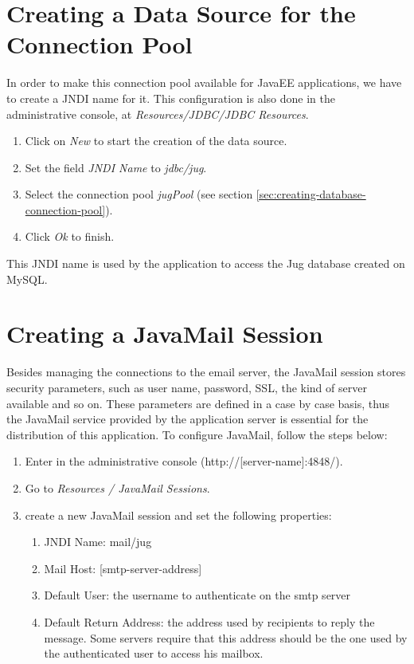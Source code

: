 \documentclass[envcountsame,envcountchap]{svmono}
\begin{document}
\section{Creating a Data Source for the Connection Pool}
\label{sec:creating-data-source-connection-pool}

In order to make this connection pool available for JavaEE applications, we have to create a JNDI name for it. This configuration is also done in the administrative console, at \textit{Resources/JDBC/JDBC Resources}.

\begin{enumerate}
\item Click on \textit{New} to start the creation of the data source.
\item Set the field \textit{JNDI Name} to \textit{jdbc/jug}.
\item Select the connection pool \textit{jugPool} (see section \ref{sec:creating-database-connection-pool}).
\item Click \textit{Ok} to finish.
\end{enumerate}
This JNDI name is used by the application to access the Jug database created on MySQL.

\section{Creating a JavaMail Session}

Besides managing the connections to the email server, the JavaMail session stores security parameters, such as user name, password, SSL, the kind of server available and so on. These parameters are defined in a case by case basis, thus the JavaMail service provided by the application server is essential for the distribution of this application. To configure JavaMail, follow the steps below:

\begin{enumerate}
\item Enter in the administrative console (http://[server-name]:4848/).
\item Go to \textit{Resources / JavaMail Sessions}.
\item create a new JavaMail session and set the following properties:
   \begin{enumerate}
   \item JNDI Name: mail/jug
   \item Mail Host: [smtp-server-address]
   \item Default User: the username to authenticate on the smtp
    server
   \item Default Return Address: the address used by recipients to
    reply the message. Some servers require that this address
    should be the one used by the authenticated user to access his
    mailbox.
   \end{enumerate}
\end{enumerate}
 
\end{document}
